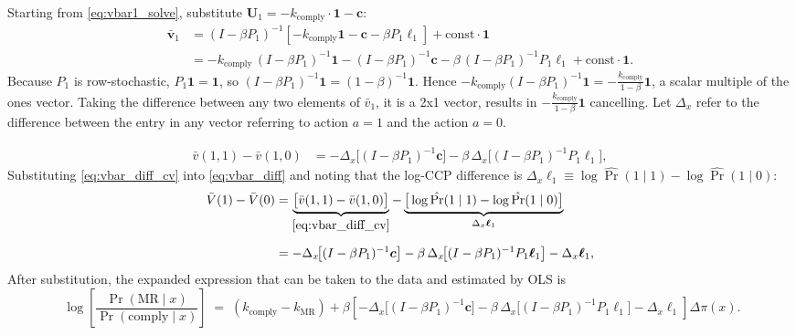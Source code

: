 \documentclass{article}
\begin{document}
Starting from \eqref{eq:vbar1_solve}, substitute
$\boldsymbol{U}_1 = -k_{\text{comply}}\cdot\mathbf{1} - \boldsymbol{c}$:
%
\begin{align}
\boldsymbol{\bar v}_1
  &= (I-\beta P_1)^{-1}
     \!\left[-k_{\text{comply}}\mathbf{1} - \boldsymbol{c}
             - \beta P_1\boldsymbol{\ell}_1\right]
     + \text{const}\cdot\mathbf{1}
\label{eq:vbar1_expand}\\[4pt]
%
  &= -k_{\text{comply}}\,(I-\beta P_1)^{-1}\mathbf{1}
     -(I-\beta P_1)^{-1}\boldsymbol{c}
     -\beta\,(I-\beta P_1)^{-1}P_1\boldsymbol{\ell}_1
     + \text{const}\cdot\mathbf{1}.
\label{eq:vbar1_decomp}
\end{align}
%
Because $P_1$ is row-stochastic, $P_1\mathbf{1}=\mathbf{1}$, so
$(I-\beta P_1)^{-1}\mathbf{1} = (1-\beta)^{-1}\mathbf{1}$. Hence
$-k_{\text{comply}}(I-\beta P_1)^{-1}\mathbf{1}
= -\tfrac{k_{\text{comply}}}{1-\beta}\mathbf{1}$,
a scalar multiple of the ones vector. Taking the difference between any two elements of $\bar v_1$, it is a 2x1 vector, results in $-\tfrac{k_{\text{comply}}}{1-\beta}\mathbf{1}$ cancelling. Let $\Delta_x$ refer to the difference between the entry in any vector referring to action $a=1$ and the action $a=0$.

%
\begin{align}
\bar v(1,1)-\bar v(1,0)
  &= -\Delta_x\!\big[(I-\beta P_1)^{-1}\boldsymbol{c}\big]
     -\beta\,\Delta_x\!\big[(I-\beta P_1)^{-1}P_1\boldsymbol{\ell}_1\big],
\label{eq:vbar_diff_cv}
\end{align}
%
Substituting \eqref{eq:vbar_diff_cv} into \eqref{eq:vbar_diff} and
noting that the log-CCP difference is $\Delta_x\boldsymbol{\ell}_1
\equiv \log\hat{\Pr}(1\mid 1)-\log\hat{\Pr}(1\mid 0)$:
%
\begin{align}
\bar V(1)-\bar V(0)
  &= \underbrace{\big[\bar v(1,1)-\bar v(1,0)\big]}_{\eqref{eq:vbar_diff_cv}}
     -\underbrace{\big[\log\hat{\Pr}(1\mid 1)-\log\hat{\Pr}(1\mid 0)\big]}_{\Delta_x\boldsymbol{\ell}_1}
\nonumber\\[6pt]
  &= -\Delta_x\!\big[(I-\beta P_1)^{-1}\boldsymbol{c}\big]
     -\beta\,\Delta_x\!\big[(I-\beta P_1)^{-1}P_1\boldsymbol{\ell}_1\big]
     -\Delta_x\boldsymbol{\ell}_1,
\end{align}
%
After substitution, the expanded expression that can be taken to the data and estimated by OLS is
\begin{equation}
    \;
\log \!\left[ \frac{\Pr(\text{MR} \mid x)}{\Pr(\text{comply} \mid x)} \right]
\;=\; (k_{\text{comply}}-k_{\text{MR}})+\beta \left[-\Delta_x\!\big[(I-\beta P_1)^{-1}\boldsymbol{c}\big]
     -\beta\,\Delta_x\!\big[(I-\beta P_1)^{-1}P_1\boldsymbol{\ell}_1\big]
     -\Delta_x\boldsymbol{\ell}_1\right]\Delta\pi(x).
\label{eq:finalest}
\end{equation}
\newpage
\end{document}
